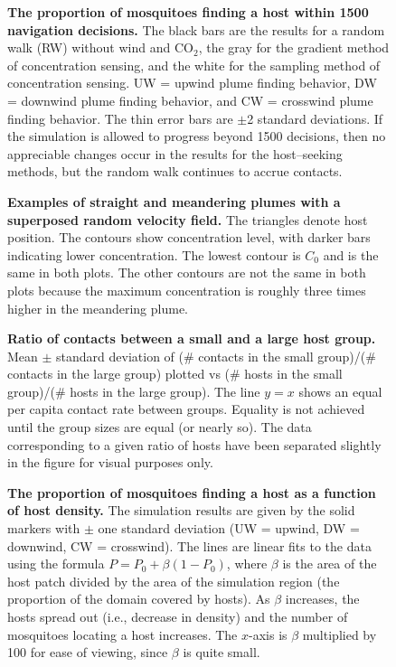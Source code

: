 \documentclass[10pt]{article}
\begin{document}
\begin{figure}[!htp]
\caption{
{\bf The proportion of mosquitoes finding a host within 1500 navigation decisions.} The black bars are the results for a random walk (RW) without wind and CO$_2$, the gray for the gradient method of concentration sensing, and the white for the sampling method of concentration sensing. UW = upwind plume finding behavior, DW = downwind plume finding behavior, and CW = crosswind plume finding behavior. The thin error bars are $\pm$2 standard deviations. If the simulation is allowed to progress beyond 1500 decisions, then no appreciable changes occur in the results for the host--seeking methods, but the random walk continues to accrue contacts. }
\label{fig:rulecomp}
\end{figure}


\begin{figure}[!htp]
\caption{
{\bf Examples of straight and meandering plumes with a superposed random velocity field.}  The triangles denote host position. The contours show concentration level, with darker bars indicating lower concentration. The lowest contour is $C_0$ and is the same in both plots. The other contours are not the same in both plots because the maximum concentration is roughly three times higher in the meandering plume.}
			\label{fig:Meander}
\end{figure}

\begin{figure}[!htp]
\caption{
{\bf Ratio of contacts between a small and a large host group.} Mean $\pm$ standard deviation of (\# contacts in the small group)/(\# contacts in the large group) plotted vs (\# hosts in the small group)/(\# hosts in the large group). The line $y=x$ shows an equal per capita contact rate between groups. Equality is not achieved until the group sizes are equal (or nearly so).  The data corresponding to a given ratio of hosts have been separated
	slightly in the figure for visual purposes only.}
	\label{fig:2groupsres}
\end{figure}

\begin{figure}[!htp]
\caption{
{\bf The proportion of mosquitoes finding a host as a function of host density.} The simulation results are given by the solid markers with $\pm$ one standard deviation (UW = upwind, DW = downwind, CW = crosswind). The lines are linear fits to the data using the formula $P = P_0 + \beta(1-P_0)$, where $\beta$ is the area of the host patch divided by the area of the simulation region (the proportion of the domain covered by hosts). As $\beta$ increases, the hosts spread out (i.e., decrease in density) and the number of mosquitoes locating a host increases. The $x$-axis is $\beta$ multiplied by 100 for ease of viewing, since $\beta$ is quite small. }
	\label{fig:Density}
\end{figure}
\end{document}
